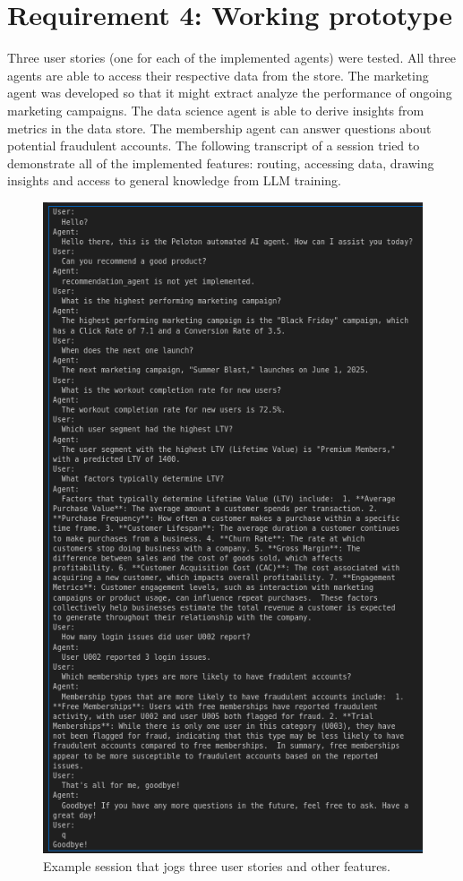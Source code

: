 \documentclass[11pt,letterpaper]{article}
\begin{document}
\section*{Requirement 4: Working prototype}
\tab Three user stories (one for each of the implemented agents) were tested. All three agents are able to access their respective data from the store. The marketing agent was developed so that it might extract analyze the performance of ongoing marketing campaigns. The data science agent is able to derive insights from metrics in the data store. The membership agent can answer questions about potential fraudulent accounts. The following transcript of a session tried to demonstrate all of the implemented features: routing, accessing data, drawing insights and access to general knowledge from LLM training.

\begin{figure}[h]
    \centering
      \includegraphics[height=1.0\textheight]{transcript.png}
      \caption{Example session that jogs three user stories and other features.}
    \label{fig:transcript}
\end{figure}
\end{document}
